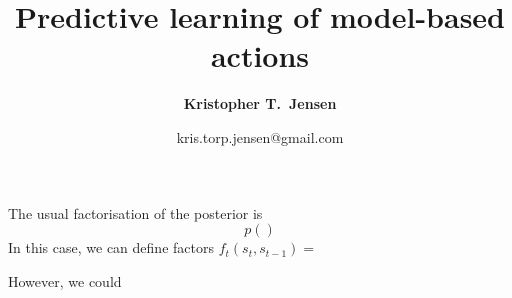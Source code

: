 \documentclass{article}
\title{Predictive learning of model-based actions}
\author[1]{\normalsize \bfseries Kristopher T.\ Jensen}
\affil[1]{ \small Sainsbury Wellcome Centre, University College London, London, UK}
\date{\vspace*{-1.5em}
\normalsize kris.torp.jensen@gmail.com
}
\begin{document}
The usual factorisation of the posterior is
\begin{equation}
p()
\end{equation}
In this case, we can define factors $f_t (s_t, s_{t-1}) = $

However, we could 
\end{document}
